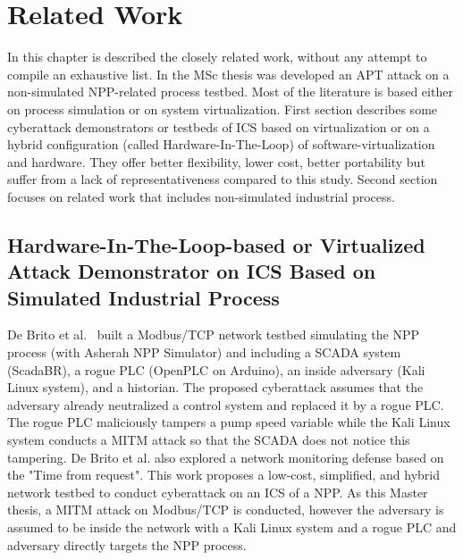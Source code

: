 \chapter{Related Work}


In this chapter is described the closely related work, without any attempt to compile an exhaustive list. 
In the MSc thesis was developed an APT attack on a non-simulated NPP-related process testbed. Most of the literature is based either on process simulation or on system virtualization. First section describes some cyberattack demonstrators or testbeds of ICS based on virtualization or on a hybrid configuration (called Hardware-In-The-Loop) of software-virtualization and hardware. They offer better flexibility, lower cost, better portability but suffer from a lack of representativeness compared to this study. Second section focuses on related work that includes non-simulated industrial process.

\section{Hardware-In-The-Loop-based or Virtualized Attack Demonstrator on ICS Based on Simulated Industrial Process}

De Brito et al.~\cite{deBrito22} built a Modbus/TCP network testbed simulating the NPP process (with Asherah NPP Simulator) and including a SCADA system (ScadaBR), a rogue PLC (OpenPLC on Arduino), an inside adversary (Kali Linux system), and a historian. The proposed cyberattack assumes that the adversary already neutralized a control system and replaced it by a rogue PLC. The rogue PLC maliciously tampers a pump speed variable while the Kali Linux system conducts a MITM attack so that the SCADA does not notice this tampering. De Brito et al. also explored a network monitoring defense based on the "Time from request".  This work proposes a low-cost, simplified, and hybrid network testbed to conduct cyberattack on an ICS of a NPP. As this Master thesis, a MITM attack on Modbus/TCP is conducted, however the adversary is assumed to be inside the network with a Kali Linux system and a rogue PLC and adversary directly targets the NPP process. 

